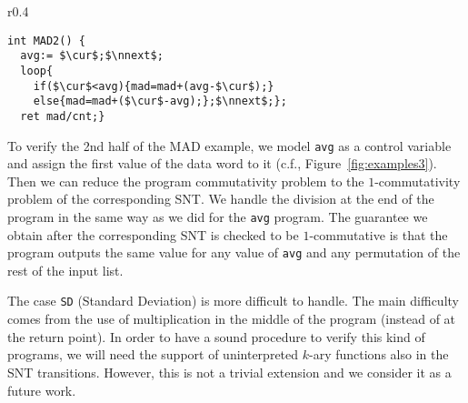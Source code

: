 \begin{wrapfigure}{r}{0.4\textwidth}
	\vspace{-0.8cm}
	\lstset{language=C,
		basicstyle=\ttfamily\scriptsize}
	\begin{lstlisting}[mathescape=true]
int MAD2() {
  avg:= $\cur$;$\nnext$;
  loop{
    if($\cur$<avg){mad=mad+(avg-$\cur$);}
    else{mad=mad+($\cur$-avg);};$\nnext$;};
  ret mad/cnt;}
	\end{lstlisting}	
	\vspace{-0.4cm}
	\caption{The 2nd half of MAD}
	\label{fig:examples3}
	\vspace{-0.7cm}
\end{wrapfigure}
To verify the 2nd half of the MAD example, we model \texttt{avg} as a control variable and assign the first value of the data word to it (c.f., Figure~\ref{fig:examples3}). 
Then we can reduce the program commutativity problem to the $1$-commutativity problem of the corresponding SNT. We handle the division at the end of the program in the same way as we did for the \texttt{avg} program. The guarantee we obtain after the corresponding SNT is checked to be $1$-commutative is that the program outputs the same value for any value of \texttt{avg} and any permutation of the rest of the input list. 

The case \texttt{SD} (Standard Deviation) is more difficult to handle. The main difficulty comes from the use of multiplication in the middle of the program (instead of at the return point). In order to have a sound procedure to verify this kind of programs, we will need the support of uninterpreted $k$-ary functions also in the SNT transitions. However, this is not a trivial extension and we consider it as a future work.


